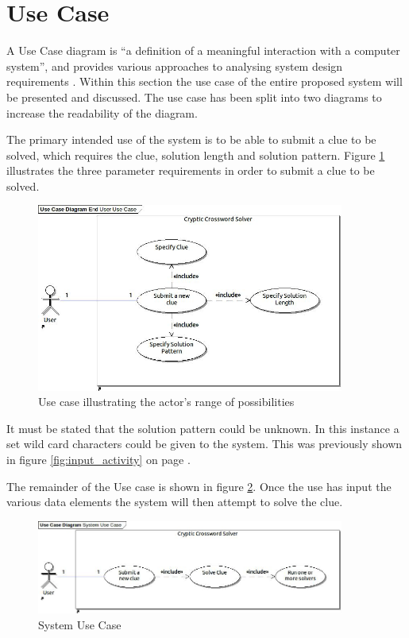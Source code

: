 \section{Use Case}
\label{sec:use_case}

A Use Case diagram is ``a definition of a meaningful interaction with a computer
system'', and provides various approaches to analysing system design 
requirements \citep{lunn03}. Within this section the use case of the entire 
proposed system will be presented and discussed. The use case has been split 
into two diagrams to increase the readability of the diagram.

The primary intended use of the system is to be able to submit a clue to be 
solved, which requires the clue, solution length and solution pattern. Figure 
\ref{fig:end_user_use_case} illustrates the three parameter requirements in 
order to submit a clue to be solved.

\begin{figure}[H]
  \centering
  \includegraphics[width=0.9\textwidth]{design/use_case/end_user_use_case.jpg}
  \caption{Use case illustrating the actor's range of possibilities}
  \label{fig:end_user_use_case}
\end{figure}

It must be stated that the solution pattern could be unknown. In this instance a
set wild card characters could be given to the system. This was previously shown
in figure \ref{fig:input_activity} on page \pageref{fig:input_activity}.

The remainder of the Use case is shown in figure \ref{fig:system_use_case}. Once
the use has input the various data elements the system will then attempt to 
solve the clue. 

\begin{figure}[H]
  \centering
  \includegraphics[width=0.9\textwidth]{design/use_case/system_use_case.jpg}
  \caption{System Use Case}
  \label{fig:system_use_case}
\end{figure}

